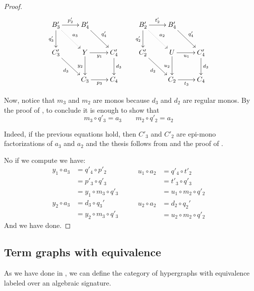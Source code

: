 \documentclass[a4paper,UKenglish,cleveref,pdftex,thm-restate,numberwithinsect]{lipics-v2021}
\def\C{\textbf {\textup{C}}}
\begin{document}
\begin{proof}
	\[\xymatrix{B'_3 \ar@{.>}[dr]^{a_3} \ar[r]^{p'_2} \ar[d]_{q'_3} &B'_4\ar[dr]^{q'_4}&& B'_2\ar@{.>}[dr]^{a_2} \ar[r]^{t'_2} \ar[d]_{q'_2} &B'_4\ar[dr]^{q'_4}\\C'_3 \ar[dr]_{d_3} &Y \ar[r]_{y_1} \ar[d]_{y_2}& C'_4\ar[d]^{d_3}&C_2' \ar[dr]_{d_2}& U \ar[d]_{u_2}\ar[r]_{u_1}& C'_4 \ar[d]^{d_3}\\&C_3 \ar[r]_{p_3}& C_4 &&C_2 \ar[r]_{t_3}& C_4 }\]
	
	Now, notice that  $m_3$ and $m_2$ are monos because $d_3$ and $d_2$ are regular monos. By the proof of , to conclude it is enough to show that
	\[m_3\circ q'_3 = a_3 \qquad m_2\circ q'_2=a_2\]
	
	Indeed, if the previous equations hold, then $C'_3$ and $C'_2$ are epi-mono factorizations of $a_3$ and $a_2$ and the thesis follows from  and the proof of .
	
	No if we compute we have:
	\[\begin{split}
		y_1\circ a_3&= q'_4\circ p'_2\\&=p'_3 \circ q'_3\\&=y_1\circ m_3\circ q'_3  
	\end{split}\qquad \begin{split}
		u_1\circ a_2&= q'_4\circ t'_2\\&=t'_3 \circ q'_3\\&=u_1\circ m_2\circ q'_2  
	\end{split}\]
	\[\begin{split}
		y_2\circ a_3&= d_3\circ q_3'\\&=y_2\circ m_3\circ q'_3
	\end{split}\qquad \begin{split}
		u_2\circ a_2&= d_2\circ q_2'\\&=u_2\circ m_2\circ q'_2
	\end{split}\]
	And we have done.
\end{proof} 


%
%

\subsection{Term graphs with equivalence}

As we have done in , we can define the category of hypergraphs with equivalence labeled over an algebraic signature.
\end{document}
